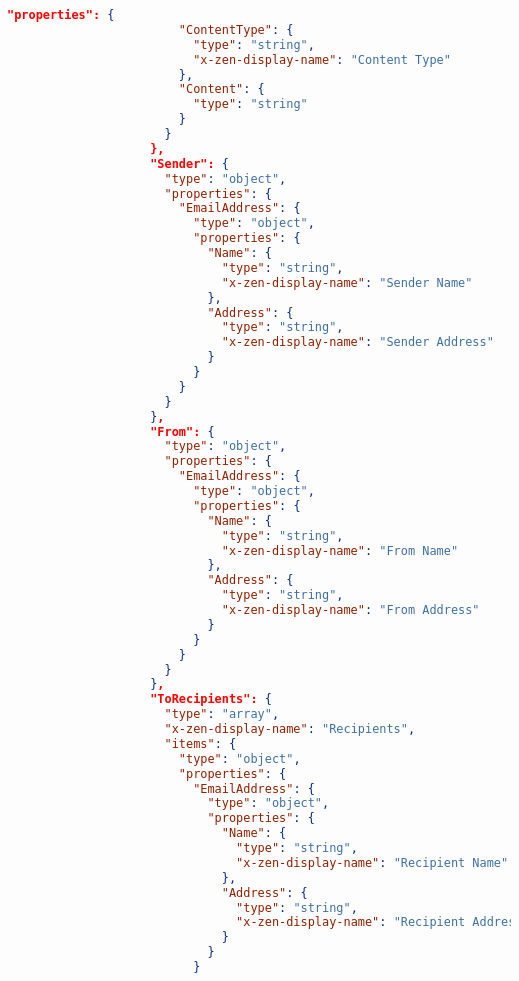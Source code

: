 \begin{lstlisting}[language=json,basicstyle=\ttfamily\tiny,numberstyle=\tiny]
                      "properties": {
                        "ContentType": {
                          "type": "string",
                          "x-zen-display-name": "Content Type"
                        },
                        "Content": {
                          "type": "string"
                        }
                      }
                    },
                    "Sender": {
                      "type": "object",
                      "properties": {
                        "EmailAddress": {
                          "type": "object",
                          "properties": {
                            "Name": {
                              "type": "string",
                              "x-zen-display-name": "Sender Name"
                            },
                            "Address": {
                              "type": "string",
                              "x-zen-display-name": "Sender Address"
                            }
                          }
                        }
                      }
                    },
                    "From": {
                      "type": "object",
                      "properties": {
                        "EmailAddress": {
                          "type": "object",
                          "properties": {
                            "Name": {
                              "type": "string",
                              "x-zen-display-name": "From Name"
                            },
                            "Address": {
                              "type": "string",
                              "x-zen-display-name": "From Address"
                            }
                          }
                        }
                      }
                    },
                    "ToRecipients": {
                      "type": "array",
                      "x-zen-display-name": "Recipients",
                      "items": {
                        "type": "object",
                        "properties": {
                          "EmailAddress": {
                            "type": "object",
                            "properties": {
                              "Name": {
                                "type": "string",
                                "x-zen-display-name": "Recipient Name"
                              },
                              "Address": {
                                "type": "string",
                                "x-zen-display-name": "Recipient Address"
                              }
                            }
                          }

\end{lstlisting}
